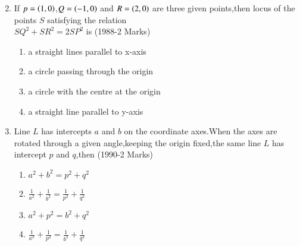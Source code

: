 \documentclass[journal,12pt,twocolumn]{IEEEtran}
\theoremstyle{remark}
\begin{document}
\begin{enumerate}
\begin{multicols}{2}
\begin{enumerate}
    \end{enumerate}
    \end{multicols}
    \item If $p=\left(1,0\right)$,$Q=\left(-1,0\right)$ and $R=\left(2,0\right)$ are three given points,then locus of the points $S$ satisfying the relation\\
    $SQ^2+SR^2=2SP^2$ is 
    \hfill(1988-2 Marks)
    \begin{enumerate}		    
        \item a straight lines parallel to x-axis
        \item a circle passing through the origin
        \item a circle with the centre at the origin 
        \item a straight line parallel to y-axis
    \end{enumerate}	
    \item Line $L$ has intercepts $a$ and $b$ on the coordinate axes.When the axes are rotated through a given angle,keeping the origin fixed,the same line $L$ has intercept $p$ and $q$,then 
    \hfill(1990-2 Marks)
    \begin{multicols}{2}
    \begin{enumerate}
        \item $a^2+b^2=p^2+q^2$
        \item $\frac{1}{a^2}+\frac{1}{b^2}=\frac{1}{p^2}+\frac{1}{q^2}$
        \item $a^2+p^2=b^2+q^2$
        \item $\frac{1}{a^2}+\frac{1}{p^2}=\frac{1}{b^2}+\frac{1}{q^2}$
    \end{enumerate}
    \end{multicols}    
\end{enumerate}
\end{document}
